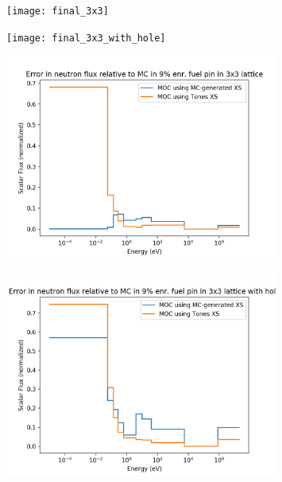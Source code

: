 \documentclass{beamer}
\begin{document}
\begin{frame}
\begin{figure}
\texttt{[image: final\_3x3]}
\end{figure}
\end{frame}


\begin{frame}
\begin{figure}
\texttt{[image: final\_3x3\_with\_hole]}
\end{figure}
\end{frame}

\begin{frame}
\begin{figure}
\includegraphics[width=0.8\textwidth]{error_3x3}
\end{figure}
\end{frame}


\begin{frame}
\begin{figure}
\includegraphics[width=0.8\textwidth]{error_3x3_with_hole}
\end{figure}
\end{frame}
\end{document}
